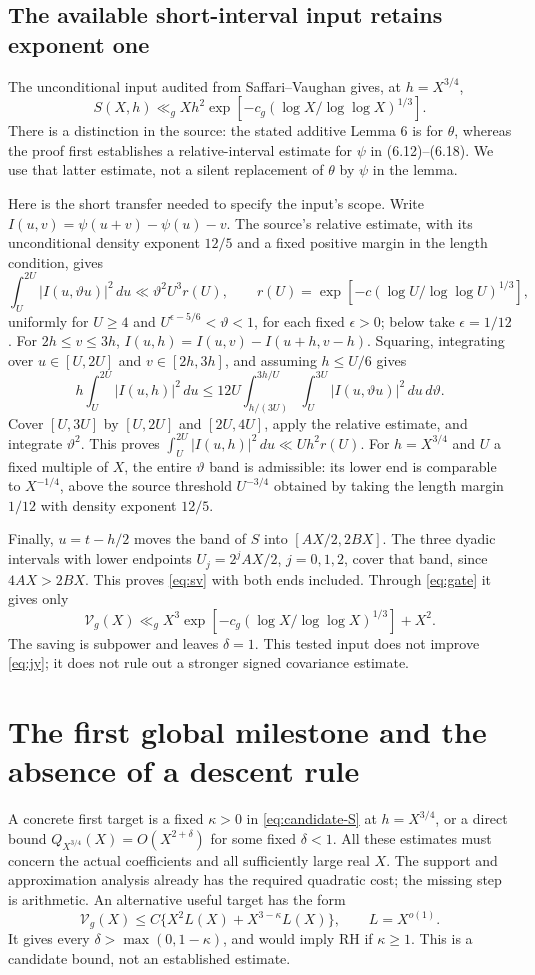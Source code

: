 \documentclass[11pt]{article}
\theoremstyle{remark}
\newcommand{\dd}{\,d}
\newcommand{\Vcal}{\mathcal V_g}
\numberwithin{equation}{section}
\begin{document}
\subsection{The available short-interval input retains exponent one}
The unconditional input audited from Saffari--Vaughan \cite[Section 6]{SV}
gives, at $h=X^{3/4}$,
\begin{equation}\label{eq:sv}
S(X,h)\ll_g Xh^2\exp[-c_g(\log X/\log\log X)^{1/3}].
\end{equation}
There is a distinction in the source: the stated additive Lemma 6 is
for $\theta$, whereas the proof first establishes a relative-interval
estimate for $\psi$ in (6.12)--(6.18). We use that latter estimate,
not a silent replacement of $\theta$ by $\psi$ in the lemma.

Here is the short transfer needed to specify the input's scope. Write
$I(u,v)=\psi(u+v)-\psi(u)-v$. The source's relative estimate, with
its unconditional density exponent $12/5$ and a fixed positive margin
in the length condition, gives
\[
\int_U^{2U}|I(u,\vartheta u)|^2\dd u
\ll\vartheta^2U^3 r(U),\qquad
r(U)=\exp[-c(\log U/\log\log U)^{1/3}],
\]
uniformly for $U\ge4$ and $U^{\epsilon-5/6}<\vartheta<1$, for
each fixed $\epsilon>0$; below take $\epsilon=1/12$.
For $2h\le v\le3h$,
$I(u,h)=I(u,v)-I(u+h,v-h)$. Squaring, integrating over
$u\in[U,2U]$ and $v\in[2h,3h]$, and assuming $h\le U/6$ gives
\[
h\int_U^{2U}|I(u,h)|^2\dd u
\le12U\int_{h/(3U)}^{3h/U}\int_U^{3U}
|I(u,\vartheta u)|^2\dd u\dd\vartheta.
\]
Cover $[U,3U]$ by $[U,2U]$ and $[2U,4U]$, apply the relative
estimate, and integrate $\vartheta^2$. This proves
$\int_U^{2U}|I(u,h)|^2\dd u\ll Uh^2r(U)$.
For $h=X^{3/4}$ and $U$ a fixed multiple of $X$, the entire
$\vartheta$ band is admissible: its lower end is comparable to
$X^{-1/4}$, above the source threshold $U^{-3/4}$ obtained by taking
the length margin $1/12$ with density exponent $12/5$.

Finally, $u=t-h/2$ moves the band of $S$ into $[AX/2,2BX]$.
The three dyadic intervals with lower endpoints
$U_j=2^jAX/2$, $j=0,1,2$, cover that band, since $4AX>2BX$.
This proves \eqref{eq:sv} with both ends included. Through
\eqref{eq:gate} it gives only
\[
\Vcal(X)\ll_g X^3\exp[-c_g(\log X/\log\log X)^{1/3}]+X^2.
\]
The saving is subpower and leaves $\delta=1$. This tested input does
not improve \eqref{eq:jy}; it does not rule out a stronger signed
covariance estimate.

\section{The first global milestone and the absence of a descent rule}
\label{sec:milestone}
A concrete first target is a fixed $\kappa>0$ in
\eqref{eq:candidate-S} at $h=X^{3/4}$, or a direct bound
$Q_{X^{3/4}}(X)=O(X^{2+\delta})$ for some fixed $\delta<1$.
All these estimates must concern the actual coefficients and all
sufficiently large real $X$. The support and approximation analysis
already has the required quadratic cost; the missing step is arithmetic.
An alternative useful target has the form
\[
\Vcal(X)\le C\{X^2L(X)+X^{3-\kappa}L(X)\},\qquad L=X^{o(1)}.
\]
It gives every $\delta>\max(0,1-\kappa)$, and would imply RH if
$\kappa\ge1$. This is a candidate bound, not an established estimate.
\end{document}

